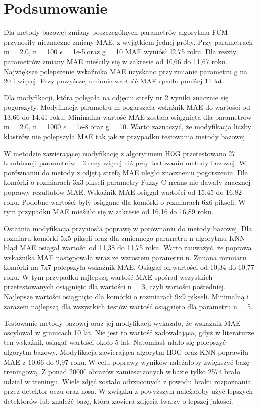 \documentclass[a4paper,twoside,12pt]{book}
\begin{document}
    \chapter{Podsumowanie}\label{ch:podsumowanie}
    Dla metody bazowej zmiany poszczególnych parametrów algorytmu FCM przynosiły nieznaczne zmiany MAE, z wyjątkiem
    jednej próby. Przy parametrach m = 2.0, n = 100 $\epsilon$ = 1e-5 oraz g = 10 MAE wyniósł 12,75 roku. Dla reszty
    parametrów zmiany MAE mieściły się w zakresie od 10,66 do 11,67 roku. Największe polepszenie wskaźnika MAE uzyskano
    przy zmianie parametru g na 20 i więcej. Przy powyższej zmianie wartość MAE spadła poniżej 11 lat.

    Dla modyfikacji, która polegała na odjęciu strefy nr 2 wyniki znacznie się pogorszyły. Modyfikacja parametru m
    pogarszała wskaźnik MAE do wartości od 13,66 do 14,41 roku. Minimalna wartość MAE została osiągnięta dla parametrów
    m = 2.0, n = 1000 $\epsilon$ = 1e-8 oraz g = 10. Warto zaznaczyć, że modyfikacja liczby klastrów nie polepszyła
    MAE tak jak w przypadku testowania metody bazowej.

    W metodzie zawierającej modyfikację z algorytmem HOG przetestowano 27 kombinacji parametrów - 3 razy więcej niż przy
    testowaniu metody bazowej. W porównaniu do metody z odjętą strefą MAE uległo znacznemu pogorszeniu. Dla komórki o
    rozmiarach 3x3 pikseli parametry Fuzzy C-means nie dawały znacznej
    poprawy rezultatów MAE. Wskaźnik MAE osiągał wartości od 15,45 do 16,82 roku. Podobne wartości były osiągane dla
    komórki o rozmiarach 6x6 pikseli. W tym przypadku MAE mieściło się w zakresie od 16,16 do 16,89 roku.

    Ostatnia modyfikacja przyniosła poprawę w porównaniu do metody bazowej.
    Dla rozmiaru komórki 5x5 pikseli oraz dla zmiennego parametru n algorytmu KNN błąd MAE osiągał wartości od 11,38 do
    11,75 roku. Warto zauważyć, że poprawa wskaźnika MAE następowała wraz ze wzrostem parametru n. Zmiana rozmiaru
    komórki na 7x7 polepszyła wskaźnik MAE. Osiągał on wartości od 10,34 do 10,77 roku. W tym przypadku najlepszą
    wartość MAE spośród wszystkich przetestowanych osiągnięto dla wartości n = 3, czyli wartości pośredniej.
    Najlepsze wartości osiągnięto dla komórki o rozmiarach 9x9 pikseli. Minimalną i zarazem najlepszą dla wszystkich testów wartość
    osiągnięto dla parametru n = 5.

    Testowanie metody bazowej oraz jej modyfikacji wykazało, że wskaźnik MAE oscylował w granicach 10 lat. Nie jest
    to wartość zadowalająca, gdyż w literaturze ten wskaźnik osiągał wartości około 5 lat. \cite{khryashchevGanin}
    Natomiast udało się polepszyć algorytm bazowy. Modyfikacja zawierająca algorytm HOG oraz KNN poprawiła MAE z 10,66 do
    9,97 roku. W celu poprawy wyników należałoby zwiększyć bazę treningową. Z ponad 20000 obrazów zamieszczonych w bazie tylko 2574
    brało udział w treningu. Wiele zdjęć zostało odrzuconych z powodu braku rozpoznania przez detektor oczu oraz nosa. W
    związku z powyższym należałoby użyć lepszych detektorów lub znaleźć bazę, która zawiera
    zdjęcia twarzy o lepszej jakości.
\end{document}

